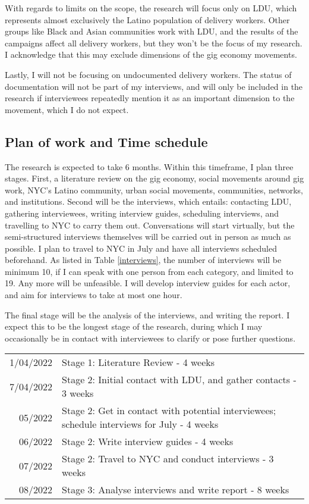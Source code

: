 \documentclass{article}[12pt]
\newcommand{\foo}{\hspace{-2.3pt}$\bullet$ \hspace{5pt}}
\begin{document}
With regards to limits on the scope, the research will focus only on LDU, which represents almost exclusively the Latino population of delivery workers. Other groups like Black and Asian communities work with LDU, and the results of the campaigns affect all delivery workers, but they won't be the focus of my research. I acknowledge that this may exclude dimensions of the gig economy movements. 

Lastly, I will not be focusing on undocumented delivery workers. The status of documentation will not be part of my interviews, and will only be included in the research if interviewees repeatedly mention it as an important dimension to the movement, which I do not expect.

\subsection{Plan of work and Time schedule}

The research is expected to take 6 months. Within this timeframe, I plan three stages. First, a literature review on the gig economy, social movements around gig work, NYC's Latino community, urban social movements, communities, networks, and institutions. Second will be the interviews, which entails: contacting LDU, gathering interviewees, writing interview guides, scheduling interviews, and travelling to NYC to carry them out. Conversations will start virtually, but the semi-structured interviews themselves will be carried out in person as much as possible. I plan to travel to NYC in July and have all interviews scheduled beforehand. As listed in Table \ref{interviews}, the number of interviews will be minimum 10, if I can speak with one person from each category, and limited to 19. Any more will be unfeasible. I will develop interview guides for each actor, and aim for interviews to take at most one hour. 

The final stage will be the analysis of the interviews, and writing the report. I expect this to be the longest stage of the research, during which I may occasionally be in contact with interviewees to clarify or pose further questions. 

\vspace{10mm}

\begin{tabular}{r |@{\foo} l}
1/04/2022 & Stage 1: Literature Review - 4 weeks\\
7/04/2022 & Stage 2: Initial contact with LDU, and gather contacts - 3 weeks\\
05/2022 & Stage 2: Get in contact with potential interviewees; schedule interviews for July - 4 weeks\\
06/2022 &  Stage 2: Write interview guides - 4 weeks\\
07/2022 & Stage 2: Travel to NYC and conduct interviews - 3 weeks\\
08/2022 & Stage 3: Analyse interviews and write report - 8 weeks\\
\end{tabular}
\end{document}
